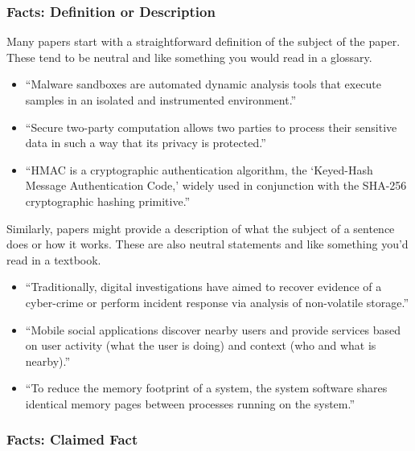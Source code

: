 \documentclass[sigconf,anonymous]{acmart}
\begin{document}
	\subsubsection{Facts: Definition or Description}
	
	Many papers start with a straightforward definition of the subject of the paper. These tend to be neutral and like something you would read in a glossary.
	
	\begin{itemize}
		
		\item	``Malware sandboxes are automated dynamic analysis tools that execute samples in an isolated and instrumented environment.''
		
		\item	``Secure two-party computation allows two parties to process their sensitive data in such a way that its privacy is protected.''
		
		\item	``HMAC is a cryptographic authentication algorithm, the ‘Keyed-Hash Message Authentication Code,’ widely used in conjunction with the SHA-256 cryptographic hashing primitive.''
		
	\end{itemize} 
	
	Similarly, papers might provide a description of what the subject of a sentence does or how it works. These are also neutral statements and like something you’d read in a textbook. 
	
	\begin{itemize}
		
		\item	``Traditionally, digital investigations have aimed to recover evidence of a cyber-crime or perform incident response via analysis of non-volatile storage.''
		
		\item	``Mobile social applications discover nearby users and provide services based on user activity (what the user is doing) and context (who and what is nearby).''
		
		\item	``To reduce the memory footprint of a system, the system software shares identical memory pages between processes running on the system.''
	\end{itemize} 	
	\subsubsection{Facts: Claimed Fact}
	
\end{document}
